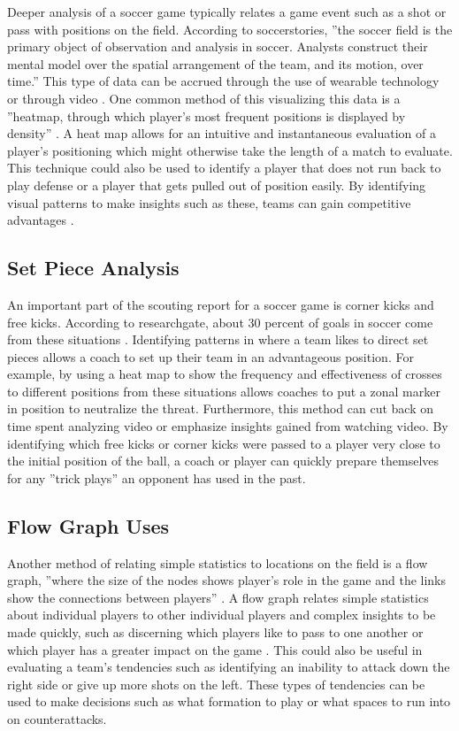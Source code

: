 \documentclass[sigconf]{acmart}
\begin{document}
{Deeper analysis of a soccer game typically relates a game event such as a shot or pass with positions on the field. According to soccerstories, ''the soccer field is the primary object of observation and analysis in soccer. Analysts construct their mental model over the spatial arrangement of the team, and its motion, over time.''\cite{SoccerStories} This type of data can be accrued through the use of wearable technology or through video \cite{SoccerStories}. One common method of this visualizing this data is a ''heatmap, through which player's most frequent positions is displayed by density'' \cite{SoccerStories}. A heat map allows for an intuitive and instantaneous evaluation of a player’s positioning which might otherwise take the length of a match to evaluate. This technique could also be used to identify a player that does not run back to play defense or a player that gets pulled out of position easily. By identifying visual patterns to make insights such as these, teams can gain competitive advantages \cite{SoccerStories}.

\subsection{Set Piece Analysis}

An important part of the scouting report for a soccer game is corner kicks and free kicks. According to researchgate, about 30 percent of goals in soccer come from these situations \cite{ResearchGate}. Identifying patterns in where a team likes to direct set pieces allows a coach to set up their team in an advantageous position. For example, by using a heat map to show the frequency and effectiveness of crosses to different positions from these situations allows coaches to put a zonal marker in position to neutralize the threat. Furthermore, this method can cut back on time spent analyzing video or emphasize insights gained from watching video. By identifying which free kicks or corner kicks were passed to a player very close to the initial position of the ball, a coach or player can quickly prepare themselves for any ''trick plays'' an opponent has used in the past.

\subsection{Flow Graph Uses}

Another method of relating simple statistics to locations on the field is a flow graph, ''where the size of the nodes shows player's role in the game and the links show the connections between players'' \cite{SoccerStories}. A flow graph relates simple statistics about individual players to other individual players and complex insights to be made quickly, such as discerning which players like to pass to one another or which player has a greater impact on the game \cite{SoccerStories}. This could also be useful in evaluating a team’s tendencies such as identifying an inability to attack down the right side or give up more shots on the left. These types of tendencies can be used to make decisions such as what formation to play or what spaces to run into on counterattacks.

}
\end{document}
